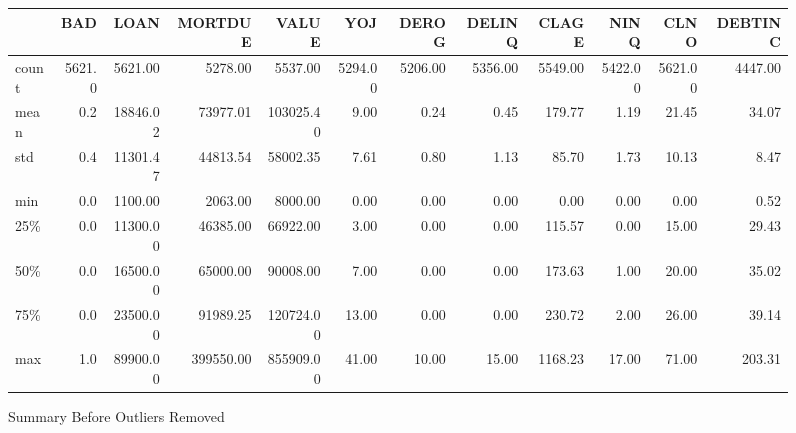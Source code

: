 \begin{landscape}
\begin{figure}[ht]
	\centering
	\renewcommand{\arraystretch}{2}
	\begin{tabular}{lrrrrrrrrrrr}
	\toprule
	{} &     BAD &      LOAN &    MORTDUE &      VALUE &      YOJ &    DEROG &   DELINQ &    CLAGE &     NINQ &     CLNO &  DEBTINC \\
	\midrule
	count &  5621.0 &   5621.00 &    5278.00 &    5537.00 &  5294.00 &  5206.00 &  5356.00 &  5549.00 &  5422.00 &  5621.00 &  4447.00 \\
	mean  &     0.2 &  18846.02 &   73977.01 &  103025.40 &     9.00 &     0.24 &     0.45 &   179.77 &     1.19 &    21.45 &    34.07 \\
	std   &     0.4 &  11301.47 &   44813.54 &   58002.35 &     7.61 &     0.80 &     1.13 &    85.70 &     1.73 &    10.13 &     8.47 \\
	min   &     0.0 &   1100.00 &    2063.00 &    8000.00 &     0.00 &     0.00 &     0.00 &     0.00 &     0.00 &     0.00 &     0.52 \\
	25\%   &     0.0 &  11300.00 &   46385.00 &   66922.00 &     3.00 &     0.00 &     0.00 &   115.57 &     0.00 &    15.00 &    29.43 \\
	50\%   &     0.0 &  16500.00 &   65000.00 &   90008.00 &     7.00 &     0.00 &     0.00 &   173.63 &     1.00 &    20.00 &    35.02 \\
	75\%   &     0.0 &  23500.00 &   91989.25 &  120724.00 &    13.00 &     0.00 &     0.00 &   230.72 &     2.00 &    26.00 &    39.14 \\
	max   &     1.0 &  89900.00 &  399550.00 &  855909.00 &    41.00 &    10.00 &    15.00 &  1168.23 &    17.00 &    71.00 &   203.31 \\
	\bottomrule
	\end{tabular}
	\caption{Summary Before Outliers Removed \label{SUM_BFR_TBL}}
\end{figure}
\end{landscape}

